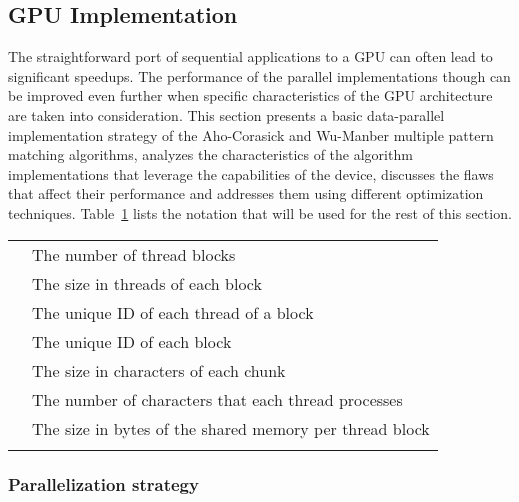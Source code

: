 \documentclass{ws-ijait}
\begin{document}
\subsection{GPU Implementation}
\label{sec:GPU-Implementation}

The straightforward port of sequential applications to a GPU can often lead to significant speedups. The performance of the parallel implementations though can be improved even further when specific characteristics of the GPU architecture are taken into consideration. This section presents a basic data-parallel implementation strategy of the Aho-Corasick and Wu-Manber multiple pattern matching algorithms, analyzes the characteristics of the algorithm implementations that leverage the capabilities of the device, discusses the flaws that affect their performance and addresses them using different optimization techniques.
Table~\ref{tab:cuda_multi_notation} lists the notation that will be used for the rest of this section.

\begin{table}
{\begin{tabular}{@{}ll@{}} \toprule
 & The number of thread blocks \\
 & The size in threads of each block \\
 & The unique ID of each thread of a block \\
 & The unique ID of each block\\
 & The size in characters of each chunk\\
 & The number of characters that each thread processes\\
 & The size in bytes of the shared memory per thread block\\ \botrule
\end{tabular}}
\label{tab:cuda_multi_notation}
\end{table}


\subsubsection{Parallelization strategy}
\label{sec:parallelizationstrategy}
\end{document}
